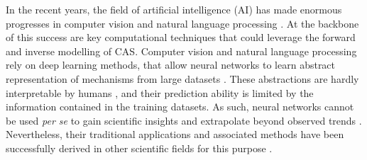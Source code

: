 In the recent years, the field of artificial intelligence (AI) has made enormous progresses in computer vision \citep{XXX} and natural language processing \citep{XXX}. At the backbone of this success are key computational techniques that could leverage the forward and inverse modelling of CAS.
% 
% 
% 
% 
% 
Computer vision and natural language processing rely on deep learning methods, that allow neural networks to learn abstract representation of mechanisms from large datasets \citep{LeCun2015}.
% 
These abstractions are hardly interpretable by humans \citep{XXX}, and their prediction ability is limited by the information contained in the training datasets. As such, neural networks cannot be used \textit{per se} to gain scientific insights and extrapolate beyond observed trends \citep{Barnosky2012,Urban2016}. %
% 
Nevertheless, their traditional applications and associated methods have been successfully derived in other scientific fields for this purpose \citep{Kashinath2021,Schneider2017,Yazdani2020,Rolnick2023}.

